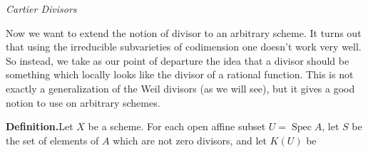 {\medskip
\textit{Cartier Divisors}\par
\noindent Now we want to extend the notion of divisor to an arbitrary scheme. It turns out that using the irreducible subvarieties of codimension one doesn't work very well. So instead, we take as our point of departure the idea that a divisor should be something which locally looks like the divisor of a rational function. This is not exactly a generalization of the Weil divisors (as we will see), but it gives a good notion to use on arbitrary schemes.

\par\smallskip\noindent\textbf{Definition.}\enspace Let $X$ be a scheme. For each open affine subset $U=\operatorname{Spec}A$, let $S$ be the set of elements of $A$ which are not zero divisors, and let $K(U)$ be
}
